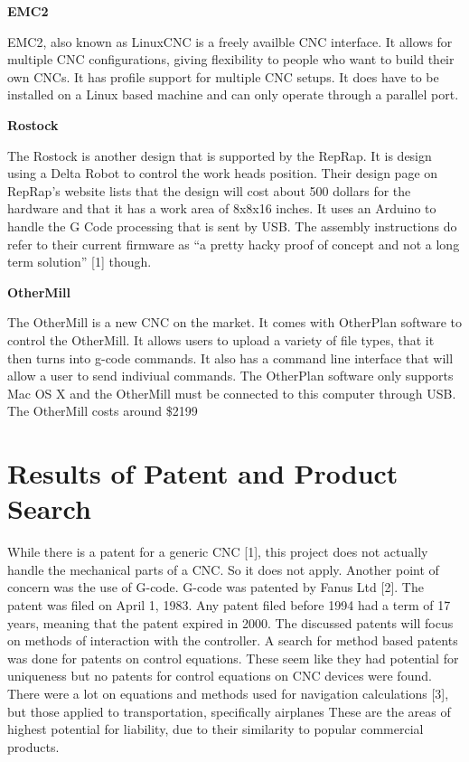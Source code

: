 \textbf{EMC2}

EMC2, also known as LinuxCNC is a freely availble CNC interface.
It allows for multiple CNC configurations, giving flexibility to people who want to build their own CNCs.
It has profile support for multiple CNC setups.
It does have to be installed on a Linux based machine and can only operate through a parallel port.

\textbf{Rostock}

The Rostock is another design that is supported by the RepRap. 
It is design using a Delta Robot to control the work heads position. 
Their design page on RepRap’s website lists that the design will cost about 500 dollars for the hardware and that it has a work area of 8x8x16 inches. 
It uses an Arduino to handle the G Code processing that is sent by USB. 
The assembly instructions do refer to their current firmware as “a pretty hacky proof of concept and not a long term solution” [1] though.

\textbf{OtherMill}

The OtherMill is a new CNC on the market.
It comes with OtherPlan software to control the OtherMill.
It allows users to upload a variety of file types, that it then turns into g-code commands.
It also has a command line interface that will allow a user to send indiviual commands.
The OtherPlan software only supports Mac OS X and the OtherMill must be connected to this computer through USB.
The OtherMill costs around \$2199

\section{Results of Patent and Product Search}


While there is a patent for a generic CNC [1], this project does not actually handle the mechanical parts of a CNC.
So it does not apply. 
Another point of concern was the use of G-code. G-code was patented by Fanus Ltd [2]. 
The patent was filed on April 1, 1983. 
Any patent filed before 1994 had a term of 17 years, meaning that the patent expired in 2000. 
The discussed patents will focus on methods of interaction with the controller. 
A search for method based patents was done for patents on control equations. 
These seem like they had potential for uniqueness but no patents for control equations on CNC devices were found. 
There were a lot on equations and methods used for navigation calculations [3], but those applied to transportation, specifically airplanes These are the areas of highest potential for liability, due to their similarity to popular commercial products.


